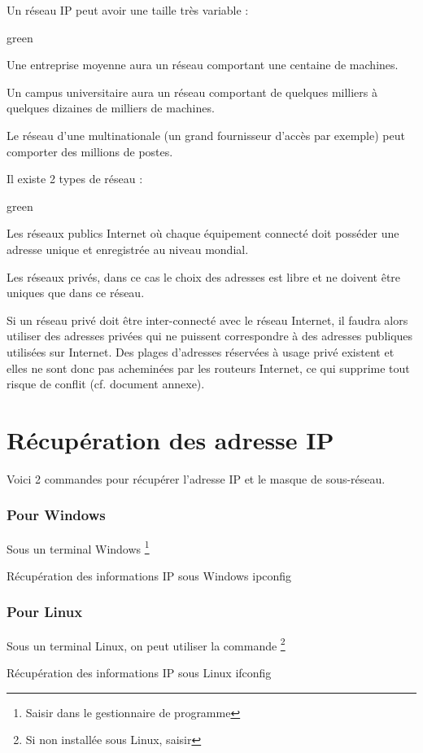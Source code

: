 Un réseau IP peut avoir une taille très variable :

\begin{items}{green}{\Bullet}
	\item Une entreprise moyenne aura un réseau comportant une centaine de machines.
	\item Un campus universitaire aura un réseau comportant de quelques milliers à quelques dizaines de milliers de machines.
	\item Le réseau d'une multinationale (un grand fournisseur d'accès par exemple) peut comporter des millions de postes.
\end{items}


Il existe 2 types de réseau :

\begin{items}{green}{\Bullet}
\item Les réseaux publics Internet où chaque équipement connecté doit posséder une adresse unique et enregistrée au niveau mondial. 
\item Les réseaux privés, dans ce cas le choix des adresses est libre et ne doivent être uniques que dans ce réseau. 
\end{items}
Si un réseau privé doit être inter-connecté avec le réseau Internet, il faudra alors utiliser des adresses privées qui 
ne puissent correspondre à des adresses publiques utilisées sur Internet. Des plages d’adresses réservées à usage privé 
existent et elles ne sont donc pas acheminées par les routeurs Internet, ce qui supprime tout risque de conflit (cf. document annexe). 


\section{Récupération des adresse IP}

Voici 2 commandes pour récupérer l'adresse IP et le masque de sous-réseau.

\subsubsection{Pour Windows}
Sous un terminal Windows \footnote{Saisir  dans le gestionnaire de programme}
\begin{Bash}{Récupération des informations IP sous Windows}
ipconfig
\end{Bash}
	

\subsubsection{Pour Linux}
Sous un terminal Linux, on peut utiliser la commande \footnote{Si non installée sous Linux, 
saisir }
\begin{Bash}{Récupération des informations IP sous Linux}
ifconfig
\end{Bash}

	
	



